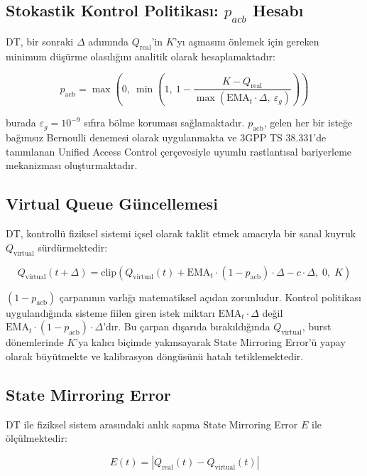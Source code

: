 \documentclass[conference]{IEEEtran}
\newcommand{\qreal}{Q_{\mathrm{real}}}
\newcommand{\qvirt}{Q_{\mathrm{virtual}}}
\newcommand{\pacb}{p_{\mathrm{acb}}}
\newcommand{\ema}{\mathrm{EMA}}
\begin{document}
\subsection{Stokastik Kontrol Politikası: $p_{acb}$ Hesabı}

DT, bir sonraki $\Delta$ adımında $\qreal$'in $K$'yı aşmasını önlemek için
gereken minimum düşürme olasılığını analitik olarak hesaplamaktadır:

\begin{equation}
\pacb = \max\!\left(0,\ \min\!\left(1,\ 1 - \frac{K - \qreal}
    {\max(\ema_t \cdot \Delta,\ \varepsilon_g)}\right)\right)
\label{eq:pacb}
\end{equation}

\noindent burada $\varepsilon_g = 10^{-9}$ sıfıra bölme koruması sağlamaktadır.
$\pacb$, gelen her bir isteğe bağımsız Bernoulli denemesi olarak uygulanmakta
ve 3GPP TS 38.331'de tanımlanan Unified Access Control çerçevesiyle uyumlu
rastlantısal bariyerleme mekanizması oluşturmaktadır.

\subsection{Virtual Queue Güncellemesi}

DT, kontrollü fiziksel sistemi içsel olarak taklit etmek amacıyla bir sanal
kuyruk $\qvirt$ sürdürmektedir:

\begin{equation}
\qvirt(t{+}\Delta) = \mathrm{clip}\!\left(
    \qvirt(t) + \ema_t \cdot (1 - \pacb) \cdot \Delta - c \cdot \Delta,\;
    0,\; K\right)
\label{eq:qvirtual}
\end{equation}

$(1 - \pacb)$ çarpanının varlığı matematiksel açıdan zorunludur. Kontrol
politikası uygulandığında sisteme fiilen giren istek miktarı $\ema_t \cdot \Delta$
değil $\ema_t \cdot (1 - \pacb) \cdot \Delta$'dır. Bu çarpan dışarıda
bırakıldığında $\qvirt$, burst dönemlerinde $K$'ya kalıcı biçimde yakınsayarak
State Mirroring Error'ü yapay olarak büyütmekte ve kalibrasyon döngüsünü hatalı
tetiklemektedir.

\subsection{State Mirroring Error}

DT ile fiziksel sistem arasındaki anlık sapma State Mirroring Error $E$ ile
ölçülmektedir:

\begin{equation}
E(t) = \left| \qreal(t) - \qvirt(t) \right|
\label{eq:error}
\end{equation}
\end{document}
